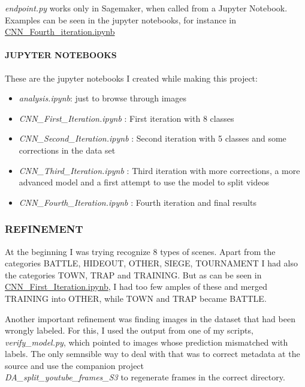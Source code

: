 \documentclass[
]{article}
\providecommand{\tightlist}{%
  \setlength{\itemsep}{0pt}\setlength{\parskip}{0pt}}
\begin{document}
\emph{endpoint.py} works only in Sagemaker, when called from a Jupyter
Notebook. Examples can be seen in the jupyter notebooks, for instance in
\url{CNN_Fourth_iteration.ipynb}

\hypertarget{jupyter-notebooks}{%
\paragraph{JUPYTER NOTEBOOKS}\label{jupyter-notebooks}}

These are the jupyter notebooks I created while making this project:

\begin{itemize}
\tightlist
\item
  \emph{analysis.ipynb}: just to browse through images
\item
  \emph{CNN\_First\_Iteration.ipynb} : First iteration with 8 classes
\item
  \emph{CNN\_Second\_Iteration.ipynb} : Second iteration with 5 classes
  and some corrections in the data set
\item
  \emph{CNN\_Third\_Iteration.ipynb} : Third iteration with more
  corrections, a more advanced model and a first attempt to use the
  model to split videos
\item
  \emph{CNN\_Fourth\_Iteration.ipynb} : Fourth iteration and final
  results
\end{itemize}

\hypertarget{refinement}{%
\subsubsection{REFINEMENT}\label{refinement}}

At the beginning I was trying recognize 8 types of scenes. Apart from
the categories BATTLE, HIDEOUT, OTHER, SIEGE, TOURNAMENT I had also the
categories TOWN, TRAP and TRAINING. But as can be seen in
\url{CNN_First_Iteration.ipynb}, I had too few amples of these and
merged TRAINING into OTHER, while TOWN and TRAP became BATTLE.

Another important refinement was finding images in the dataset that had
been wrongly labeled. For this, I used the output from one of my
scripts, \emph{verify\_model.py}, which pointed to images whose
prediction mismatched with labels. The only semnsible way to deal with
that was to correct metadata at the source and use the companion
project\\
\emph{DA\_split\_youtube\_frames\_S3} to regenerate frames in the
correct directory.
\end{document}
